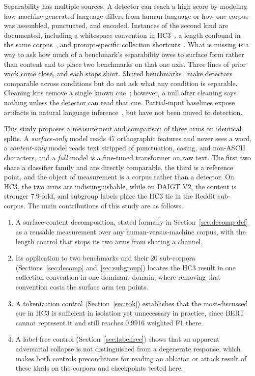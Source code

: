 \documentclass[conference,a4paper]{IEEEtran}
\newcommand{\secref}[1]{\hyperref[#1]{\ref*{#1}}}
\begin{document}
Separability has multiple sources. A detector can reach a high score by modeling how machine-generated language differs from human language or how one corpus was assembled, punctuated, and encoded. Instances of the second kind are documented, including a whitespace convention in HC3~\cite{Tian2023multiscale}, a length confound in the same corpus~\cite{Baidya2026detecting}, and prompt-specific collection shortcuts~\cite{Park2024investigating}. What is missing is a way to ask how much of a benchmark's separability owes to surface form rather than content and to place two benchmarks on that one axis. Three lines of prior work come close, and each stops short. Shared benchmarks~\cite{Dugan2024raid,Wang2024m4} make detectors comparable across conditions but do not ask what any condition is separable. Cleaning kits remove a single known cue~\cite{Tian2023multiscale}; however, a null after cleaning says nothing unless the detector can read that cue. Partial-input baselines expose artifacts in natural language inference~\cite{Gururangan2018annotation,Poliak2018hypothesis}, but have not been moved to detection.

This study proposes a measurement and comparison of three arms on identical splits. A \emph{surface-only} model reads 47 orthographic features and never sees a word, a \emph{content-only} model reads text stripped of punctuation, casing, and non-ASCII characters, and a \emph{full} model is a fine-tuned transformer on raw text. The first two share a classifier family and are directly comparable, the third is a reference point, and the object of measurement is a corpus rather than a detector. On HC3, the two arms are indistinguishable, while on DAIGT V2, the content is stronger 7.9-fold, and subgroup labels place the HC3 tie in the Reddit sub-corpus. The main contributions of this study are as follows.
\begin{enumerate}
\item A surface-content decomposition, stated formally in Section~\secref{sec:decomp-def} as a reusable measurement over any human-versus-machine corpus, with the length control that stops its two arms from sharing a channel.
\item Its application to two benchmarks and their 20 sub-corpora (Sections~\secref{sec:decomp} and~\secref{sec:subgroup}) locates the HC3 result in one collection convention in one dominant domain, where removing that convention costs the surface arm ten points.
\item A tokenization control (Section~\secref{sec:tok}) establishes that the most-discussed cue in HC3 is sufficient in isolation yet unnecessary in practice, since BERT cannot represent it and still reaches 0.9916 weighted F1 there.
\item A label-free control (Section~\secref{sec:labelfree}) shows that an apparent adversarial collapse is not distinguished from a degenerate response, which makes both controls preconditions for reading an ablation or attack result of these kinds on the corpora and checkpoints tested here.
\end{enumerate}
\end{document}

